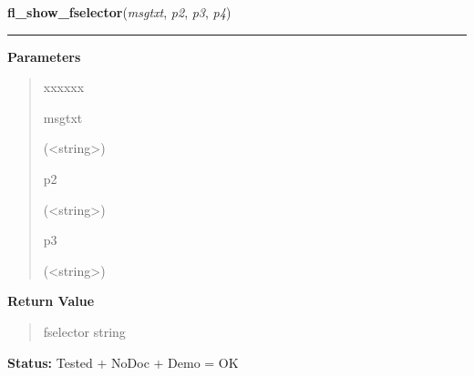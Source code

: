     \label{xformslib:library:fl_show_fselector}

    \vspace{0.5ex}

\hspace{.8\funcindent}\begin{boxedminipage}{\funcwidth}

    \raggedright \textbf{fl\_show\_fselector}(\textit{msgtxt}, \textit{p2}, \textit{p3}, \textit{p4})

    \vspace{-1.5ex}

    \rule{\textwidth}{0.5\fboxrule}
\setlength{\parskip}{2ex}
\setlength{\parskip}{1ex}
      \textbf{Parameters}
      \vspace{-1ex}

      \begin{quote}
        \begin{Ventry}{xxxxxx}

          \item[msgtxt]

          ({\textless}string{\textgreater})

          \item[p2]

          ({\textless}string{\textgreater})

          \item[p3]

          ({\textless}string{\textgreater})

        \end{Ventry}

      \end{quote}

      \textbf{Return Value}
    \vspace{-1ex}

      \begin{quote}
      fselector string

      \end{quote}

\textbf{Status:} Tested + NoDoc + Demo = OK



    \end{boxedminipage}

    \label{xformslib:library:fl_show_fselector}

